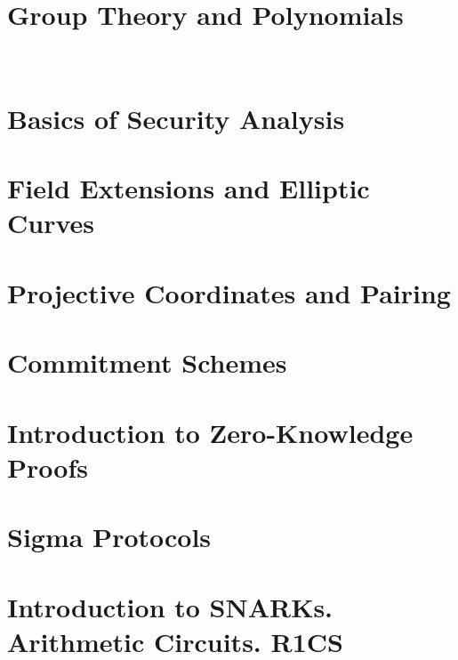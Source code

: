 \documentclass{zkdl-template-105x135-nohead}
\begin{document}

    \section{Group Theory and Polynomials}

     

    \section{Basics of Security Analysis}\label{section:math-crypto-2}

    

    \section{Field Extensions and Elliptic Curves}

    \label{section:field_extensions}

    \section{Projective Coordinates and Pairing}

    

    \section{Commitment Schemes}

    

    \section{Introduction to Zero-Knowledge Proofs}

    

    \section{Sigma Protocols}

    

    \section[Introduction to SNARKs]{Introduction to SNARKs. Arithmetic Circuits. R1CS}
\end{document}

